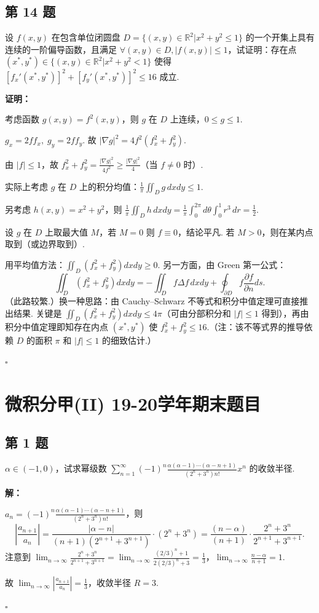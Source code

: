 \documentclass[12pt,a4paper]{article}
\newenvironment{sol}[1][解]{%
  \par\medskip\noindent\textbf{#1：}\itshape\par\noindent\ignorespaces
}{%
  \par\hfill$\square$\par\medskip
}
\begin{document}
\subsection*{第 14 题}
设 $f(x,y)$ 在包含单位闭圆盘 $D=\{(x,y)\in\mathbb{R}^2|x^2+y^2\le 1\}$
的一个开集上具有连续的一阶偏导函数，且满足 $\forall(x,y)\in D, |f(x,y)|\le 1$，试证明：存在点
$(x^*,y^*)\in\{(x,y)\in\mathbb{R}^2|x^2+y^2<1\}$ 使得
$[f_x'(x^*,y^*)]^2+[f_y'(x^*,y^*)]^2\le 16$ 成立.

\begin{sol}[证明]考虑函数 $g(x,y)=f^2(x,y)$，则 $g$ 在 $D$ 上连续，$0\le g\le 1$.

  $g_x=2ff_x,\; g_y=2ff_y$. 故 $|\nabla g|^2=4f^2(f_x^2+f_y^2)$.

  由 $|f|\le 1$，故 $f_x^2+f_y^2=\frac{|\nabla g|^2}{4f^2}\ge\frac{|\nabla
  g|^2}{4}$（当 $f\ne 0$ 时）.

  实际上考虑 $g$ 在 $D$ 上的积分均值：$\frac{1}{\pi}\iint_D g\,dxdy\le 1$.

  另考虑 $h(x,y)=x^2+y^2$，则 $\frac{1}{\pi}\iint_D
  h\,dxdy=\frac{1}{\pi}\int_0^{2\pi}d\theta\int_0^1 r^3\,dr=\frac{1}{2}$.

  设 $g$ 在 $D$ 上取最大值 $M$，若 $M=0$ 则 $f\equiv 0$，结论平凡. 若 $M>0$，则在某内点取到（或边界取到）.

  用平均值方法：$\iint_D(f_x^2+f_y^2)dxdy\ge 0$. 另一方面，由 Green 第一公式：
  $$\iint_D(f_x^2+f_y^2)dxdy=-\iint_D f\Delta f\,dxdy+\oint_{\partial
  D}f\frac{\partial f}{\partial n}ds.$$
  （此路较繁.）换一种思路：由 Cauchy--Schwarz 不等式和积分中值定理可直接推出结果. 关键是
  $\iint_D(f_x^2+f_y^2)dxdy\le 4\pi$（可由分部积分和 $|f|\le 1$
  得到），再由积分中值定理即知存在内点 $(x^*,y^*)$ 使 $f_x^2+f_y^2\le 16$.（注：该不等式界的推导依赖
  $D$ 的面积 $\pi$ 和 $|f|\le 1$ 的细致估计.）

\end{sol}
\section*{微积分甲(II) 19-20学年期末题目}

\subsection*{第 1 题}
$\alpha\in(-1,0)$，试求幂级数 $\sum_{n=1}^{\infty}(-1)^n
\frac{\alpha(\alpha-1)\cdots(\alpha-n+1)}{(2^n+3^n)n!}x^n$ 的收敛半径.

\begin{sol}$a_n=(-1)^n\frac{\alpha(\alpha-1)\cdots(\alpha-n+1)}{(2^n+3^n)n!}$，则
  $$\left|\frac{a_{n+1}}{a_n}\right|=\frac{|\alpha-n|}{(n+1)(2^{n+1}+3^{n+1})}\cdot(2^n+3^n)=\frac{(n-\alpha)}{(n+1)}\cdot\frac{2^n+3^n}{2^{n+1}+3^{n+1}}.$$
  注意到
  $\lim_{n\to\infty}\frac{2^n+3^n}{2^{n+1}+3^{n+1}}=\lim_{n\to\infty}\frac{(2/3)^n+1}{2(2/3)^n+3}=\frac{1}{3}$，$\lim_{n\to\infty}\frac{n-\alpha}{n+1}=1$.

  故 $\lim_{n\to\infty}\left|\frac{a_{n+1}}{a_n}\right|=\frac{1}{3}$，收敛半径 $R=3$.

\end{sol}
\end{document}
